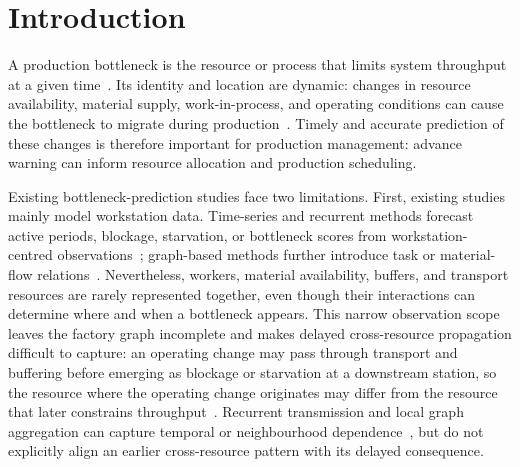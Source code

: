 \documentclass[a4paper,fleqn]{cas-dc}
\begin{document}
\section{Introduction} \label{sec:intro}

A production bottleneck is the resource or process that limits system throughput at a given time~\cite{subramaniyan2023throughput,tang2024comprehensive}. Its identity and location are dynamic: changes in resource availability, material supply, work-in-process, and operating conditions can cause the bottleneck to migrate during production~\cite{lai2021data}. Timely and accurate prediction of these changes is therefore important for production management: advance warning can inform resource allocation and production scheduling.

Existing bottleneck-prediction studies face two limitations. First, existing studies mainly model workstation data. Time-series and recurrent methods forecast active periods, blockage, starvation, or bottleneck scores from workstation-centred observations~\cite{li2011throughput,subramaniyan2018data,lai2018twolayer,liu2023lstmdam}; graph-based methods further introduce task or material-flow relations~\cite{lai2023bstan,yin2025btgcn,ma2023tusb,cen2025dstnn,wu2025knowledge}. Nevertheless, workers, material availability, buffers, and transport resources are rarely represented together, even though their interactions can determine where and when a bottleneck appears. This narrow observation scope leaves the factory graph incomplete and makes delayed cross-resource propagation difficult to capture: an operating change may pass through transport and buffering before emerging as blockage or starvation at a downstream station, so the resource where the operating change originates may differ from the resource that later constrains throughput~\cite{gu2015passive,zhang2022vulnerability}. Recurrent transmission and local graph aggregation can capture temporal or neighbourhood dependence~\cite{liu2023lstmdam,yin2025btgcn}, but do not explicitly align an earlier cross-resource pattern with its delayed consequence.
\end{document}
